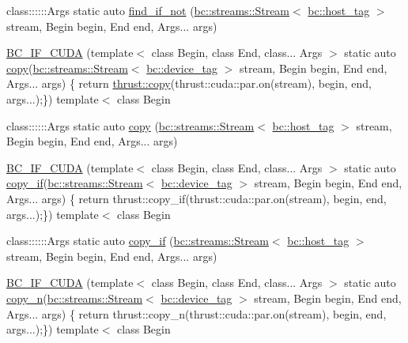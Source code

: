 \begin{DoxyCompactItemize}
\item 
class\+::::::\+Args static auto \hyperlink{namespacebc_1_1algorithms_a24ea4f55c7904296a82c1e6f6515cc46}{find\+\_\+if\+\_\+not} (\hyperlink{classbc_1_1streams_1_1Stream}{bc\+::streams\+::\+Stream}$<$ \hyperlink{structbc_1_1host__tag}{bc\+::host\+\_\+tag} $>$ stream, Begin begin, End end, Args... args)
\item 
\hyperlink{namespacebc_1_1algorithms_aa9d173a186c6e2baa71cc25153bf43ba}{B\+C\+\_\+\+I\+F\+\_\+\+C\+U\+DA} (template$<$ class Begin, class End, class... Args $>$ static auto \hyperlink{namespacebc_1_1algorithms_a2f21a8743360da646967e9e2f402b560}{copy}(\hyperlink{classbc_1_1streams_1_1Stream}{bc\+::streams\+::\+Stream}$<$ \hyperlink{structbc_1_1device__tag}{bc\+::device\+\_\+tag} $>$ stream, Begin begin, End end, Args... args) \{ return \hyperlink{tensor__utility_8h_aef49432640ea9d0daf2be2cb6e2bd5f7}{thrust\+::copy}(thrust\+::cuda\+::par.\+on(stream), begin, end, args...);\}) template$<$ class Begin
\item 
class\+::::::\+Args static auto \hyperlink{namespacebc_1_1algorithms_a2f21a8743360da646967e9e2f402b560}{copy} (\hyperlink{classbc_1_1streams_1_1Stream}{bc\+::streams\+::\+Stream}$<$ \hyperlink{structbc_1_1host__tag}{bc\+::host\+\_\+tag} $>$ stream, Begin begin, End end, Args... args)
\item 
\hyperlink{namespacebc_1_1algorithms_a2bbbed92b3cca0cffb91f0c7239eeee7}{B\+C\+\_\+\+I\+F\+\_\+\+C\+U\+DA} (template$<$ class Begin, class End, class... Args $>$ static auto \hyperlink{namespacebc_1_1algorithms_a1bae159c938465c4632a83a8fdbb5a0f}{copy\+\_\+if}(\hyperlink{classbc_1_1streams_1_1Stream}{bc\+::streams\+::\+Stream}$<$ \hyperlink{structbc_1_1device__tag}{bc\+::device\+\_\+tag} $>$ stream, Begin begin, End end, Args... args) \{ return thrust\+::copy\+\_\+if(thrust\+::cuda\+::par.\+on(stream), begin, end, args...);\}) template$<$ class Begin
\item 
class\+::::::\+Args static auto \hyperlink{namespacebc_1_1algorithms_a1bae159c938465c4632a83a8fdbb5a0f}{copy\+\_\+if} (\hyperlink{classbc_1_1streams_1_1Stream}{bc\+::streams\+::\+Stream}$<$ \hyperlink{structbc_1_1host__tag}{bc\+::host\+\_\+tag} $>$ stream, Begin begin, End end, Args... args)
\item 
\hyperlink{namespacebc_1_1algorithms_a161e599f5cf14530122981793708e331}{B\+C\+\_\+\+I\+F\+\_\+\+C\+U\+DA} (template$<$ class Begin, class End, class... Args $>$ static auto \hyperlink{namespacebc_1_1algorithms_a597f05cc11712b045091b2ae51de5414}{copy\+\_\+n}(\hyperlink{classbc_1_1streams_1_1Stream}{bc\+::streams\+::\+Stream}$<$ \hyperlink{structbc_1_1device__tag}{bc\+::device\+\_\+tag} $>$ stream, Begin begin, End end, Args... args) \{ return thrust\+::copy\+\_\+n(thrust\+::cuda\+::par.\+on(stream), begin, end, args...);\}) template$<$ class Begin

\end{DoxyCompactItemize}
